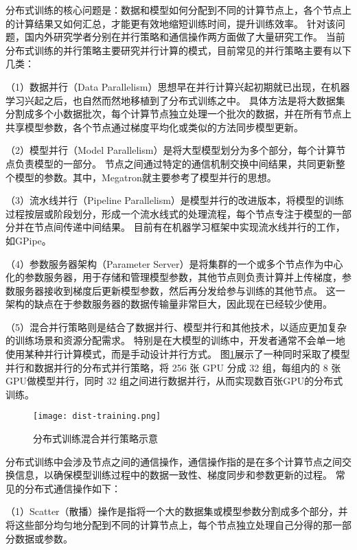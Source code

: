 分布式训练的核心问题是：数据和模型如何分配到不同的计算节点上，各个节点上的计算结果又如何汇总，才能更有效地缩短训练时间，提升训练效率。
针对该问题，国内外研究学者分别在并行策略和通信操作两方面做了大量研究工作。
当前分布式训练的并行策略主要研究并行计算的模式，目前常见的并行策略主要有以下几类：

（1）数据并行（Data Parallelism）思想早在并行计算兴起初期就已出现，在机器学习兴起之后，也自然而然地移植到了分布式训练之中。
具体方法是将大数据集分割成多个小数据批次，每个计算节点独立处理一个批次的数据，并在所有节点上共享模型参数，各个节点通过梯度平均化或类似的方法同步模型更新。

（2）模型并行（Model Parallelism）是将大型模型划分为多个部分，每个计算节点负责模型的一部分。
节点之间通过特定的通信机制交换中间结果，共同更新整个模型的参数。其中，Megatron就主要参考了模型并行的思想。

（3）流水线并行（Pipeline Parallelism）是模型并行的改进版本，将模型的训练过程按层或阶段划分，形成一个流水线式的处理流程，每个节点专注于模型的一部分并在节点间传递中间结果。
目前有在机器学习框架中实现流水线并行的工作，如GPipe。

（4）参数服务器架构（Parameter Server）是将集群的一个或多个节点作为中心化的参数服务器，用于存储和管理模型参数，其他节点则负责计算并上传梯度，参数服务器接收到梯度后更新模型参数，然后再分发给参与训练的其他节点。
这一架构的缺点在于参数服务器的数据传输量非常巨大，因此现在已经较少使用。

（5）混合并行策略则是结合了数据并行、模型并行和其他技术，以适应更加复杂的训练场景和资源分配需求。
特别是在大模型的训练中，开发者通常不会单一地使用某种并行计算模式，而是手动设计并行方式。
图\ref{fig:disttraining}展示了一种同时采取了模型并行和数据并行的分布式并行策略，将 256 张 GPU 分成 32 组，每组内的 8 张GPU做模型并行，同时 32 组之间进行数据并行，从而实现数百张GPU的分布式训练。

\begin{figure}
  \centering
  \texttt{[image: dist-training.png]}
  \caption{分布式训练混合并行策略示意}
  \label{fig:disttraining}
\end{figure}

分布式训练中会涉及节点之间的通信操作，通信操作指的是在多个计算节点之间交换信息，以确保模型训练过程中的数据一致性、梯度同步和参数更新的过程。
常见的分布式通信操作如下：

（1）Scatter（散播）操作是指将一个大的数据集或模型参数分割成多个部分，并将这些部分均匀地分配到不同的计算节点上，每个节点独立处理自己分得的那一部分数据或参数。


